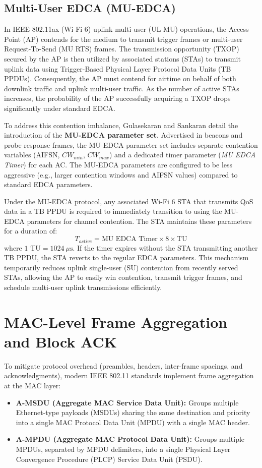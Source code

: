 \subsection{Multi-User EDCA (MU-EDCA)}
In IEEE 802.11ax (Wi-Fi 6) uplink multi-user (UL MU) operations, the Access Point (AP) contends for the medium to transmit trigger frames or multi-user Request-To-Send (MU RTS) frames. The transmission opportunity (TXOP) secured by the AP is then utilized by associated stations (STAs) to transmit uplink data using Trigger-Based Physical Layer Protocol Data Units (TB PPDUs). Consequently, the AP must contend for airtime on behalf of both downlink traffic and uplink multi-user traffic. As the number of active STAs increases, the probability of the AP successfully acquiring a TXOP drops significantly under standard EDCA.

To address this contention imbalance, Gulasekaran and Sankaran \cite{gulasekaran2021wifi6} detail the introduction of the \textbf{MU-EDCA parameter set}. Advertised in beacons and probe response frames, the MU-EDCA parameter set includes separate contention variables (AIFSN, $CW_{min}$, $CW_{max}$) and a dedicated timer parameter (\textit{MU EDCA Timer}) for each AC. The MU-EDCA parameters are configured to be less aggressive (e.g., larger contention windows and AIFSN values) compared to standard EDCA parameters.

Under the MU-EDCA protocol, any associated Wi-Fi 6 STA that transmits QoS data in a TB PPDU is required to immediately transition to using the MU-EDCA parameters for channel contention. The STA maintains these parameters for a duration of:
\begin{equation}
    T_{active} = \text{MU EDCA Timer} \times 8 \times \text{TU}
\end{equation}
where $1 \text{ TU} = 1024~\mu\text{s}$. If the timer expires without the STA transmitting another TB PPDU, the STA reverts to the regular EDCA parameters. This mechanism temporarily reduces uplink single-user (SU) contention from recently served STAs, allowing the AP to easily win contention, transmit trigger frames, and schedule multi-user uplink transmissions efficiently.

\section{MAC-Level Frame Aggregation and Block ACK}
To mitigate protocol overhead (preambles, headers, inter-frame spacings, and acknowledgments), modern IEEE 802.11 standards implement frame aggregation at the MAC layer:
\begin{itemize}
    \item \textbf{A-MSDU (Aggregate MAC Service Data Unit):} Groups multiple Ethernet-type payloads (MSDUs) sharing the same destination and priority into a single MAC Protocol Data Unit (MPDU) with a single MAC header.
    \item \textbf{A-MPDU (Aggregate MAC Protocol Data Unit):} Groups multiple MPDUs, separated by MPDU delimiters, into a single Physical Layer Convergence Procedure (PLCP) Service Data Unit (PSDU).
\end{itemize}

